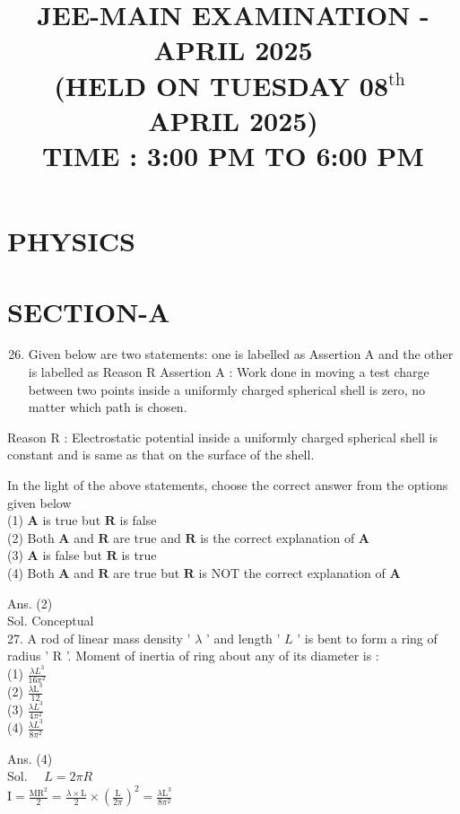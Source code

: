 \documentclass[10pt]{article}
\title{JEE-MAIN EXAMINATION - APRIL 2025 \\
 (HELD ON TUESDAY \(\mathbf{0 8}^{\text {th }}\) APRIL 2025) \\
 TIME : 3:00 PM TO 6:00 PM }
\author{}
\date{}
\begin{document}
\maketitle
\section*{PHYSICS}
\section*{SECTION-A}
\begin{enumerate}
  \setcounter{enumi}{25}
  \item Given below are two statements: one is labelled as Assertion A and the other is labelled as Reason R Assertion A : Work done in moving a test charge between two points inside a uniformly charged spherical shell is zero, no matter which path is chosen.
\end{enumerate}

Reason R : Electrostatic potential inside a uniformly charged spherical shell is constant and is same as that on the surface of the shell.

In the light of the above statements, choose the correct answer from the options given below\\
(1) \(\mathbf{A}\) is true but \(\mathbf{R}\) is false\\
(2) Both \(\mathbf{A}\) and \(\mathbf{R}\) are true and \(\mathbf{R}\) is the correct explanation of \(\mathbf{A}\)\\
(3) \(\mathbf{A}\) is false but \(\mathbf{R}\) is true\\
(4) Both \(\mathbf{A}\) and \(\mathbf{R}\) are true but \(\mathbf{R}\) is NOT the correct explanation of \(\mathbf{A}\)

Ans. (2)\\
Sol. Conceptual\\
27. A rod of linear mass density ' \(\lambda\) ' and length ' \(L\) ' is bent to form a ring of radius ' R '. Moment of inertia of ring about any of its diameter is :\\
(1) \(\frac{\lambda L^{3}}{16 \pi^{2}}\)\\
(2) \(\frac{\lambda \mathrm{L}^{3}}{12}\)\\
(3) \(\frac{\lambda L^{3}}{4 \pi^{2}}\)\\
(4) \(\frac{\lambda L^{3}}{8 \pi^{2}}\)

Ans. (4)\\
Sol. \(\quad L=2 \pi R\)\\
\(\mathrm{I}=\frac{\mathrm{MR}^{2}}{2}=\frac{\lambda \times \mathrm{L}}{2} \times\left(\frac{\mathrm{L}}{2 \pi}\right)^{2}=\frac{\lambda \mathrm{L}^{3}}{8 \pi^{2}}\)
\end{document}

